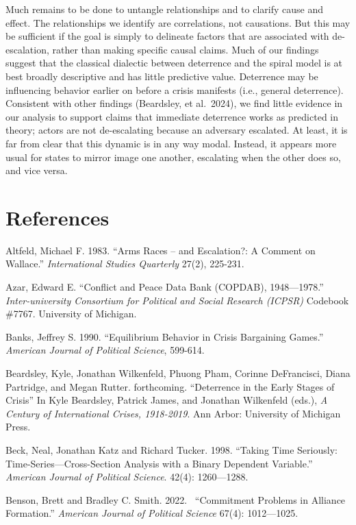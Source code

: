 \documentclass[
]{article}
\begin{document}
Much remains to be done to untangle relationships and to clarify cause
and effect. The relationships we identify are correlations, not
causations. But this may be sufficient if the goal is simply to
delineate factors that are associated with de-escalation, rather than
making specific causal claims. Much of our findings suggest that the
classical dialectic between deterrence and the spiral model is at best
broadly descriptive and has little predictive value. Deterrence may be
influencing behavior earlier on before a crisis manifests (i.e., general
deterrence). Consistent with other findings (Beardsley, et al.~2024), we
find little evidence in our analysis to support claims that immediate
deterrence works as predicted in theory; actors are not de-escalating
because an adversary escalated. At least, it is far from clear that this
dynamic is in any way modal. Instead, it appears more usual for states
to mirror image one another, escalating when the other does so, and vice
versa.

\section{References}\label{references}

Altfeld, Michael F. 1983. ``Arms Races -- and Escalation?: A Comment on
Wallace.'' \emph{International Studies Quarterly} 27(2), 225-231.

Azar, Edward E. ``Conflict and Peace Data Bank (COPDAB), 1948---1978.''
\emph{Inter-university Consortium for Political and Social Research
(ICPSR)} Codebook \#7767. University of Michigan.

Banks, Jeffrey S. 1990. ``Equilibrium Behavior in Crisis Bargaining
Games.'' \emph{American Journal of Political Science}, 599-614.

Beardsley, Kyle, Jonathan Wilkenfeld, Phuong Pham, Corinne DeFrancisci,
Diana Partridge, and Megan Rutter. forthcoming. ``Deterrence in the
Early Stages of Crisis'' In Kyle Beardsley, Patrick James, and Jonathan
Wilkenfeld (eds.), \emph{A Century of International Crises, 1918-2019}.
Ann Arbor: University of Michigan Press.

Beck, Neal, Jonathan Katz and Richard Tucker. 1998. ``Taking Time
Seriously:~ Time-Series---Cross-Section Analysis with a Binary Dependent
Variable.'' \emph{American Journal of Political Science}. 42(4):
1260---1288.~

Benson, Brett and Bradley C. Smith. 2022.~ ``Commitment Problems in
Alliance Formation.'' \emph{American Journal of Political Science}
67(4): 1012---1025.
\end{document}
